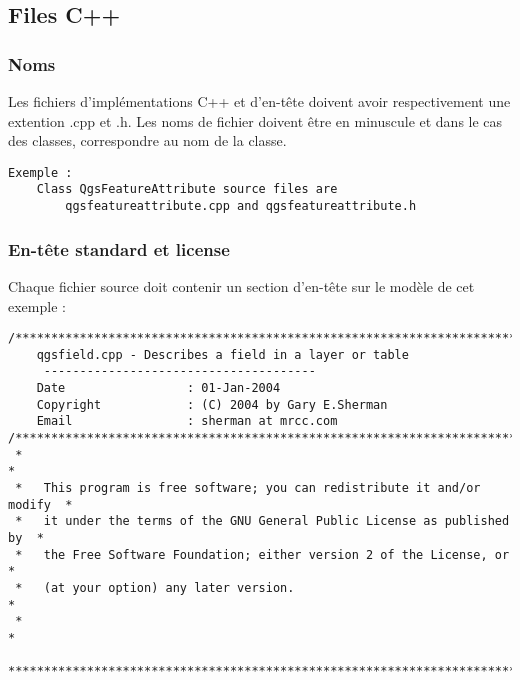 \subsection{Files C++}
\subsubsection{Noms}
Les fichiers d'implémentations C++ et d'en-tête doivent avoir respectivement une extention .cpp et .h. Les noms de fichier doivent être en minuscule et dans le cas des classes, correspondre au nom de la classe.

\begin{verbatim}
Exemple :
	Class QgsFeatureAttribute source files are 
		qgsfeatureattribute.cpp and qgsfeatureattribute.h
\end{verbatim}

\subsubsection{En-tête standard et license}
Chaque fichier source doit contenir un section d'en-tête sur le modèle de cet exemple :

\begin{verbatim}
/***************************************************************************
    qgsfield.cpp - Describes a field in a layer or table
     --------------------------------------
    Date                 : 01-Jan-2004
    Copyright            : (C) 2004 by Gary E.Sherman
    Email                : sherman at mrcc.com
/***************************************************************************
 *                                                                         *
 *   This program is free software; you can redistribute it and/or modify  *
 *   it under the terms of the GNU General Public License as published by  *
 *   the Free Software Foundation; either version 2 of the License, or     *
 *   (at your option) any later version.                                   *
 *                                                                         *
 ***************************************************************************/
\end{verbatim}


